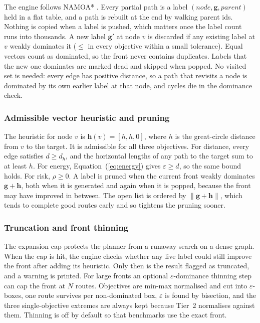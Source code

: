 \documentclass{ssnreview}
\begin{document}
The engine follows NAMOA* \cite{r17}. Every partial path is a label
$(\mathit{node}, \mathbf{g}, \mathit{parent})$ held in a flat table, and a path is rebuilt
at the end by walking parent ids. Nothing is copied when a label is pushed, which matters
once the label count runs into thousands. A new label $\mathbf{g}'$ at node $v$ is
discarded if any existing label at $v$ weakly dominates it ($\leq$ in every objective
within a small tolerance). Equal vectors count as dominated, so the front never contains
duplicates. Labels that the new one dominates are marked dead and skipped when popped.
No visited set is needed: every edge has positive distance, so a path that revisits a node
is dominated by its own earlier label at that node, and cycles die in the dominance check.

\subsubsection{Admissible vector heuristic and pruning}

The heuristic for node $v$ is $\mathbf{h}(v) = [h, h, 0]$, where $h$ is the great-circle
distance from $v$ to the target. It is admissible for all three objectives. For distance,
every edge satisfies $d \geq d_h$, and the horizontal lengths of any path to the target sum
to at least $h$. For energy, Equation~(\ref{eq:energy}) gives $\varepsilon \geq d$, so the
same bound holds. For risk, $\rho \geq 0$. A label is pruned when the current front weakly
dominates $\mathbf{g} + \mathbf{h}$, both when it is generated and again when it is popped,
because the front may have improved in between. The open list is ordered by
$\lVert\mathbf{g} + \mathbf{h}\rVert$, which tends to complete good routes early and so
tightens the pruning sooner.

\subsubsection{Truncation and front thinning}

The expansion cap protects the planner from a runaway search on a dense graph. When the
cap is hit, the engine checks whether any live label could still improve the front after
adding its heuristic. Only then is the result flagged as truncated, and a warning is
printed. For large fronts an optional $\varepsilon$-dominance thinning step can cap the
front at $N$ routes. Objectives are min-max normalised and cut into $\varepsilon$-boxes,
one route survives per non-dominated box, $\varepsilon$ is found by bisection, and the three
single-objective extremes are always kept because Tier~2 normalises against them. Thinning
is off by default so that benchmarks use the exact front.
\end{document}
